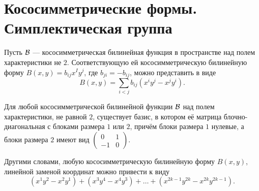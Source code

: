 \section{Кососимметрические формы. Симплектическая группа}

Пусть $\mathcal{B}$ --- кососимметрическая билинейная функция в пространстве над полем характеристики не $2$. Соответствующую ей кососимметрическую билинейную форму $B(x, y) = b_{ij}x^Iy^j$, где $b_{ji} = -b_{ij}$, можно представить в виде
\[
    B(x, y) = \sum_{i < j}b_{ij}(x^iy^j - x^jy^i).
\]

\begin{theorem}
    Для любой кососимметрической билинейной функции $\mathcal{B}$ над полем характеристики, не равной $2$, существует базис, в котором её матрица блочно-диагональная с блоками размера $1$ или $2$, причём блоки размера $1$ нулевые, а блоки размера $2$ имеют вид
    $
    \begin{pmatrix}
        0 & 1\\
        -1 & 0
    \end{pmatrix}
    $.

    Другими словами, любую кососимметрическую билинейную форму $B(x, y)$, линейной заменой координат можно привести к виду
    \[
        (x^1y^2 - x^2y^1) + (x^3y^4 - x^4y^3) + \ldots + (x^{2k - 1}y^{2k} - x^{2k}y^{2k - 1}).
    \]
\end{theorem}

